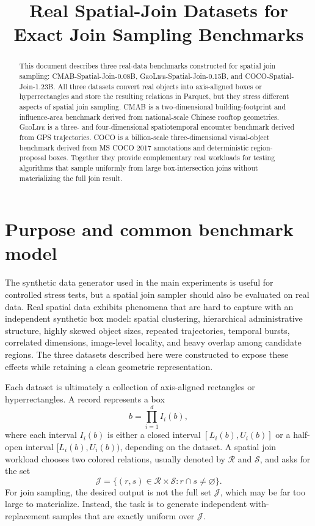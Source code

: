 \documentclass[11pt]{article}
\title{Real Spatial-Join Datasets for Exact Join Sampling Benchmarks}
\author{}
\date{}
\newcommand{\Rrel}{\mathcal R}
\newcommand{\Srel}{\mathcal S}
\newcommand{\Jset}{\mathcal J}
\newcommand{\cmab}{\textsc{CMAB}}
\newcommand{\geolife}{\textsc{GeoLife}}
\newcommand{\coco}{\textsc{COCO}}
\begin{document}
\maketitle

\begin{abstract}
This document describes three real-data benchmarks constructed for spatial join sampling:
\cmab-Spatial-Join-0.08B, \geolife-Spatial-Join-0.15B, and \coco-Spatial-Join-1.23B.  All three datasets convert real objects into axis-aligned boxes or hyperrectangles and store the resulting relations in Parquet, but they stress different aspects of spatial join sampling.  \cmab{} is a two-dimensional building-footprint and influence-area benchmark derived from national-scale Chinese rooftop geometries.  \geolife{} is a three- and four-dimensional spatiotemporal encounter benchmark derived from GPS trajectories.  \coco{} is a billion-scale three-dimensional visual-object benchmark derived from MS COCO 2017 annotations and deterministic region-proposal boxes.  Together they provide complementary real workloads for testing algorithms that sample uniformly from large box-intersection joins without materializing the full join result.
\end{abstract}

\section{Purpose and common benchmark model}
\label{sec:purpose}

The synthetic data generator used in the main experiments is useful for controlled stress tests, but a spatial join sampler should also be evaluated on real data.  Real spatial data exhibits phenomena that are hard to capture with an independent synthetic box model: spatial clustering, hierarchical administrative structure, highly skewed object sizes, repeated trajectories, temporal bursts, correlated dimensions, image-level locality, and heavy overlap among candidate regions.  The three datasets described here were constructed to expose these effects while retaining a clean geometric representation.

Each dataset is ultimately a collection of axis-aligned rectangles or hyperrectangles.  A record represents a box
\[
  b = \prod_{i=1}^{d} I_i(b),
\]
where each interval $I_i(b)$ is either a closed interval $[L_i(b),U_i(b)]$ or a half-open interval $[L_i(b),U_i(b))$, depending on the dataset.  A spatial join workload chooses two colored relations, usually denoted by $\Rrel$ and $\Srel$, and asks for the set
\[
  \Jset = \{(r,s)\in \Rrel\times\Srel : r \cap s \neq \varnothing\}.
\]
For join sampling, the desired output is not the full set $\Jset$, which may be far too large to materialize.  Instead, the task is to generate independent with-replacement samples that are exactly uniform over $\Jset$.
\end{document}
